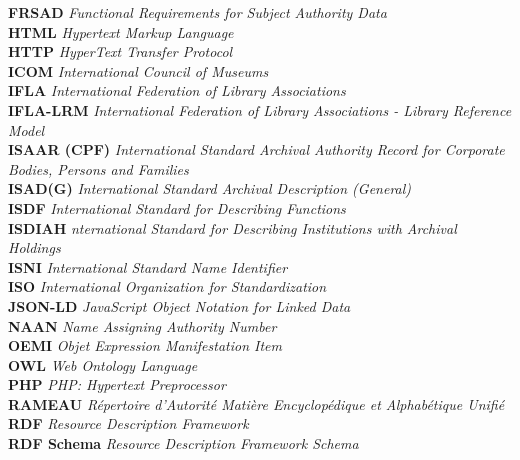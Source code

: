 \documentclass[a4paper,12pt,twoside]{book}
\begin{document}
\textbf{FRSAD}     \space\space\space\textit{Functional Requirements for Subject Authority Data}\\
\textbf{HTML}     \space\space\space\textit{Hypertext Markup Language}\\
\textbf{HTTP}     \space\space\space\textit{HyperText Transfer Protocol}\\
\textbf{ICOM}     \space\space\space\textit{International Council of Museums}\\
\textbf{IFLA}     \space\space\space\textit{International Federation of Library Associations}\\
\textbf{IFLA-LRM}     \space\space\space\textit{International Federation of Library Associations - Library Reference Model}\\
\textbf{ISAAR (CPF)}     \space\space\space\textit{International Standard Archival Authority Record for Corporate Bodies, Persons and Families}\\
\textbf{ISAD(G)}     \space\space\space\textit{International Standard Archival Description (General)}\\
\textbf{ISDF}     \space\space\space\textit{International Standard for Describing Functions}\\
\textbf{ISDIAH}     \space\space\space\textit{nternational Standard for Describing Institutions with Archival Holdings}\\
\textbf{ISNI}     \space\space\space\textit{International Standard Name Identifier}\\
\textbf{ISO}     \space\space\space\textit{International Organization for Standardization}\\
\textbf{JSON-LD}     \space\space\space\textit{JavaScript Object Notation for Linked Data}\\
\textbf{NAAN}     \space\space\space\textit{Name Assigning Authority Number}\\
\textbf{OEMI}     \space\space\space\textit{Objet Expression Manifestation Item}\\
\textbf{OWL}     \space\space\space\textit{Web Ontology Language}\\
\textbf{PHP}     \space\space\space\textit{PHP: Hypertext Preprocessor}\\
\textbf{RAMEAU}     \space\space\space\textit{Répertoire d’Autorité Matière Encyclopédique et Alphabétique Unifié}\\
\textbf{RDF}     \space\space\space\textit{Resource Description Framework}\\
\textbf{RDF Schema}     \space\space\space\textit{Resource Description Framework Schema}\\
\end{document}
